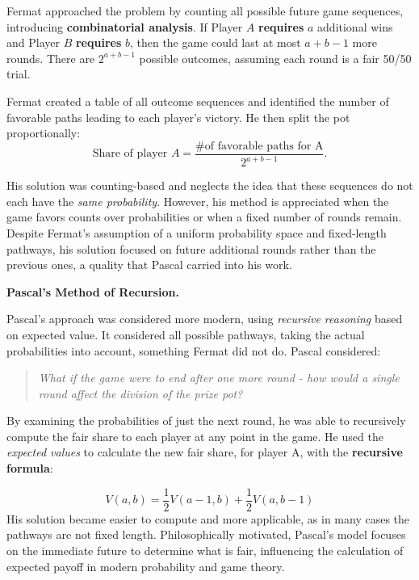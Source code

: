 Fermat approached the problem by counting all possible future game sequences, introducing \textbf{combinatorial analysis}. If Player \(A\) \textbf{requires} \(a\) additional wins and Player \(B\) \textbf{requires} \(b\), then the game could last at most \(a + b - 1\) more rounds. There are \(2^{a+b-1}\) possible outcomes, assuming each round is a fair 50/50 trial.

Fermat created a table of all outcome sequences and identified the number of favorable paths leading to each player's victory. He then split the pot proportionally:
\[
\text{Share of player } A = \frac{\text{\# of favorable paths for A}}{2^{a+b-1}}.
\]

His solution was counting-based and neglects the idea that these sequences do not each have the \textit{same probability}. However, his method is appreciated when the game favors counts over probabilities or when a fixed number of rounds remain. Despite Fermat's assumption of a uniform probability space and fixed-length pathways, his solution focused on future additional rounds rather than the previous ones, a quality that Pascal carried into his work. 

\vspace{1em}
\noindent\textbf{Pascal’s Method of Recursion.}
\vspace{1em}

Pascal's approach was considered more modern, using \textit{recursive reasoning} based on expected value. It considered all possible pathways, taking the actual probabilities into account, something Fermat did not do. Pascal considered: 

\begin{quote}
    \textit{What if the game were to end after one more round - how would a single round affect the division of the prize pot?}
\end{quote}

By examining the probabilities of just the next round, he was able to recursively compute the fair share to each player at any point in the game. He used the \textit{expected values} to calculate the new fair share, for player A, with the \textbf{recursive formula}:

\begin{equation*}
    V(a, b) = \frac{1}{2}V(a-1, b) + \frac{1}{2}V(a, b-1)
\end{equation*}
His solution became easier to compute and more applicable, as in many cases the pathways are not fixed length. Philosophically motivated, Pascal's model focuses on the immediate future to determine what is fair, influencing the calculation of expected payoff in modern probability and game theory. 

